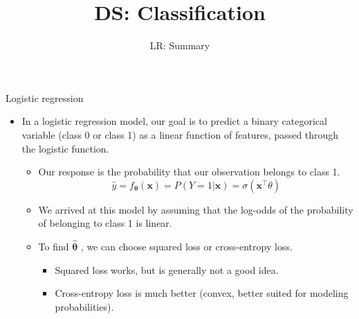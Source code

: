 \documentclass[aspectratio=169]{../latex_main/tntbeamer}  %
\title[LR:Summary]{DS: Classification}
\subtitle{LR: Summary}
\begin{document}
	
	\maketitle
	\begin{frame}{Logistic regression}
	    \begin{itemize}
	        \item In a logistic regression model, our goal is to predict a binary categorical variable (class 0 or class 1) as a linear function of features, passed through the logistic function.
	        \begin{itemize}
	            \item Our response is the probability that our observation belongs to class 1.
	            \begin{equation*}
	                \hat{y} = f_{\bm{\theta}}(\bm{x}) = P(Y=1|\bm{x}) = \sigma (\bm{x}^\intercal\theta)
	            \end{equation*}
	            \item We arrived at this model by assuming that the log-odds of the probability of belonging to class 1 is linear.
	            \item To find  $\hat{\bm{\theta}}$  , we can choose squared loss or cross-entropy loss.
                \begin{itemize}
                    \item Squared loss works, but is generally not a good idea.
                    \item Cross-entropy loss is much better (convex, better suited for modeling probabilities).
                \end{itemize}
	        \end{itemize}
	    \end{itemize}
	\end{frame}
	
	
	
	                    
\end{document}
